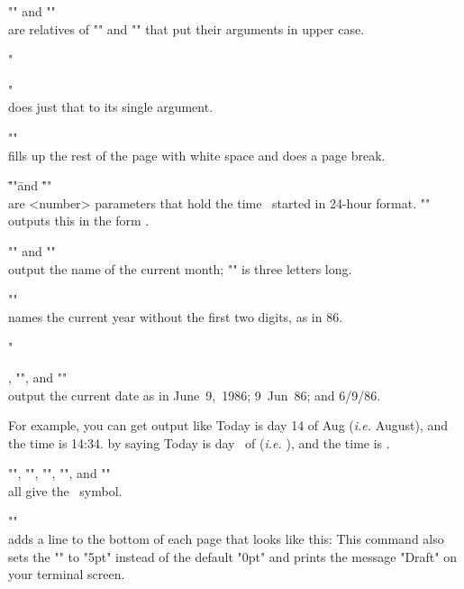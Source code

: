 \*\+"\ucsy"\+ and \+"\ucsybox"\+\\are relatives of "\sy" and
"\sybox" that put their arguments in upper case.

\*\+"\ignore"\+\\does just that to its single argument.

\*\+"\filpage"\+\\fills up the rest of the page with white space
and does a page break.

\endgab


\begingab

\*\="\hour"\= and \="\minute"\=\\are <number> parameters that
hold the time \ytex\ started in 24-hour format.  \+"\daytime"\+
outputs this in the form .

\*\+"\monthname"\+ and \+"\monthshortname"\+\\output the name of
the current month; "\monthshortname" is three letters long.

\*\+"\shortyear"\+\\names the current year without the first two
digits, as in 86.

\*\+"\date"\+, \+"\shortdate"\+, and \+"\slashdate"\+\\output the
current date as in June~9,~1986; 9~Jun~86; and 6/9/86.

\endgab

For example, you can get output like
\begintext
Today is day 14 of Aug ({\it{}i.e.} August), %
and the time is 14:34.
\endtext
by saying
\beginverb
Today is day \number\day\ of \monthshortname
({\it i.e.} \monthname), and the time is \daytime.
\endverb


\begingab

\*\+"\ytex"\+, "\yTeX", "\YTEX", "\YTeX", and \+"\oopstex"\+\\all
give the \ytex\ symbol.

\*\+"\draft"\+\\adds a line to the bottom of each page that looks
like this:
\begintextlines
\let\message=\ignore%
\draft\line{\the\bottomgloss}%
\endtextlines
This command also sets the "\overfullrule" to "5pt" instead of
the default "0pt" and prints the message "{Draft}" on your
terminal screen.

\endgab

